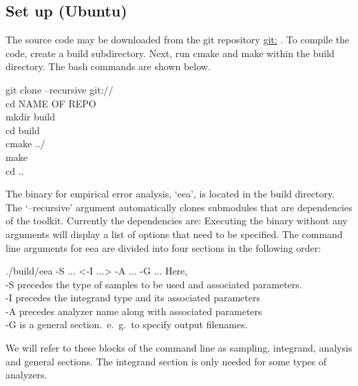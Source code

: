 \subsection{Set up (Ubuntu)}
The source code may be downloaded from the git repository \url{git:} .
 To compile the code, create a build subdirectory. Next, run cmake and make within the build directory. The bash commands are shown below. 
\begin{tcolorbox}
  git clone --recursive  git:// \\
  cd NAME OF REPO\\
  mkdir build\\
  cd build\\
  cmake ../ \\
  make\\
  cd ..\\
\end{tcolorbox}
The binary for empirical error analysis, `eea', is located in the build directory. The `--recursive' argument automatically clones submodules that are dependencies of the toolkit. Currently the dependencies are:  Executing the binary without any arguments will display a list of options that need to be specified. The command line arguments for eea are divided into four sections in the following order:
\begin{tcolorbox}
 ./build/eea -S  ... <-I ...> -A ... -G ...
\tcblower
Here, \\
-S precedes the type of samples to be used and associated parameters. \\
-I precedes the integrand type and its associated parameters \\
-A precedes analyzer name along with associated parameters \\
-G is a general section.~e.~g.~to specify output filenames.
\end{tcolorbox}
 We will refer to these blocks of the command line as sampling, integrand, analysis and general sections. The integrand section is only needed for some types of analyzers.
 
